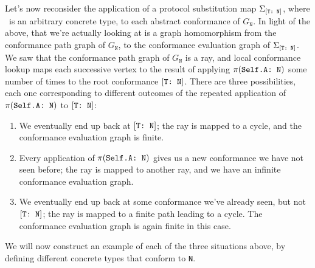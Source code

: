 \documentclass[../generics]{subfiles}
\begin{document}
Let's now reconsider the application of a protocol substitution map $\Sigma_{[\texttt{T:~N}]}$, where \tT\ is an arbitrary concrete type, to each abstract conformance of $G_{\texttt{N}}$. In light of the above, that we're actually looking at is a graph homomorphism from the conformance path graph of $G_{\texttt{N}}$, to the conformance evaluation graph of $\Sigma_{[\texttt{T:~N}]}$. We saw that the conformance path graph of $G_{\texttt{N}}$ is a ray, and local conformance lookup maps each successive vertex to the result of applying $\pi(\texttt{Self.A:~N})$ some number of times to the root conformance $[\texttt{T:~N}]$. There are three possibilities, each one corresponding to different outcomes of the repeated application of $\pi(\texttt{Self.A:~N})$ to $[\texttt{T:~N}]$:
\begin{enumerate}
\item We eventually end up back at $[\texttt{T:~N}]$; the ray is mapped to a cycle, and the conformance evaluation graph is finite.
\item Every application of $\pi(\texttt{Self.A:~N})$ gives us a new conformance we have not seen before; the ray is mapped to another ray, and we have an infinite conformance evaluation graph.
\item We eventually end up back at some conformance we've already seen, but not $[\texttt{T:~N}]$; the ray is mapped to a finite path leading to a cycle. The conformance evaluation graph is again finite in this case.
\end{enumerate}
We will now construct an example of each of the three situations above, by defining different concrete types that conform to \texttt{N}.
\end{document}

